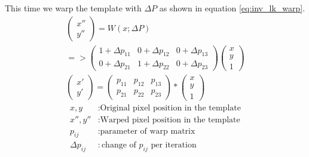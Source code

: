 \documentclass[11pt,a4paper,titlepage,oneside]{report}
\begin{document}
This time we warp the template with $\Delta P$ as shown in equation \ref{eq:inv_lk_warp}. 
\begin{equation}\label{eq:inv_lk_warp}
  \begin{gathered}
    \begin{pmatrix}
      x'' \\
      y''
    \end{pmatrix}=
    W(x;\Delta P)\\
    =>\begin{pmatrix}
      1 + \Delta p_{11} & 0 + \Delta p_{12} & 0 + \Delta p_{13} \\
      0 + \Delta p_{21} & 1 + \Delta p_{22} & 0 + \Delta p_{23}
    \end{pmatrix}
    \begin{pmatrix}
      x\\
      y\\
      1
    \end{pmatrix}\\
    \begin{pmatrix}
      x' \\
      y'
    \end{pmatrix}=
    \begin{pmatrix}
      p_{11} & p_{12} & p_{13} \\
      p_{21} & p_{22} & p_{23}
    \end{pmatrix}*
    \begin{pmatrix}
      x\\
      y\\
      1
    \end{pmatrix}
  \end{gathered}
\end{equation}
\begin{align*}
  x,y            &: \text{Original pixel position in the template}\\
  x'',y''        &: \text{Warped pixel position in the template}\\
  p_{ij}         &: \text{parameter of warp matrix}\\
  \Delta p_{ij}  &: \text{change of $p_{ij}$ per iteration}
\end{align*}
\end{document}
